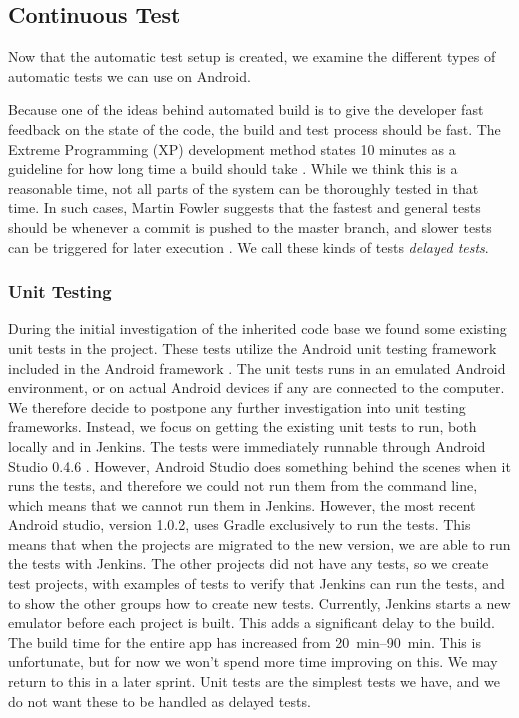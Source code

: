 \subsection{Continuous Test}
\label{sec:test_automation}
Now that the automatic test setup is created, we examine the different types of automatic tests we can use on Android.

Because one of the ideas behind automated build is to give the developer fast feedback on the state of the code, the build and test process should be fast. The Extreme Programming (XP) development method states 10 minutes as a guideline for how long time a build should take \parencite{beck2004}. While we think this is a reasonable time, not all parts of the system can be thoroughly tested in that time. In such cases, Martin Fowler suggests that the fastest and general tests should be whenever a commit is pushed to the master branch, and slower tests can be triggered for later execution \parencite{fowlerCI}. We call these kinds of tests \emph{delayed tests}.

\subsubsection{Unit Testing}
During the initial investigation of the inherited code base we found some existing unit tests in the  project. These tests utilize the Android unit testing framework  included in the Android framework \parencite{AndroidUnit}. The unit tests runs in an emulated Android environment, or on actual Android devices if any are connected to the computer. We therefore decide to postpone any further investigation into unit testing frameworks. Instead, we focus on getting the existing unit tests to run, both locally and in Jenkins. The tests were immediately runnable through Android Studio 0.4.6 . However, Android Studio does something behind the scenes when it runs the tests, and therefore we could not run them from the command line, which means that we cannot run them in Jenkins. However, the most recent Android studio, version 1.0.2, uses Gradle exclusively to run the tests. This means that when the projects are migrated to the new version, we are able to run the tests with Jenkins.
The other projects did not have any tests, so we create test projects, with examples of tests to verify that Jenkins can run the tests, and to show the other groups how to create new tests.
Currently, Jenkins starts a new emulator before each project is built. This adds a significant delay to the build. The build time for the entire app has increased from \SIrange[range-units = single]{20}{90}{\minute}. This is unfortunate, but for now we won't spend more time improving on this. We may return to this in a later sprint. Unit tests are the simplest tests we have, and we do not want these to be handled as delayed tests.


